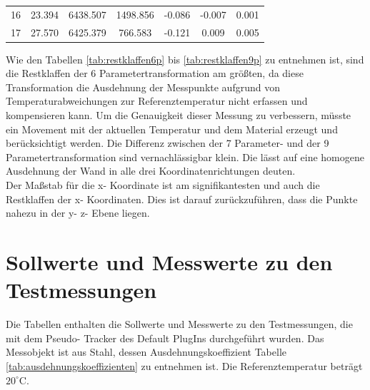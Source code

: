 \begin{table}[h]
\begin{tabular}{ccccccc}
\multicolumn{1}{p{2cm}|}{16} &
\multicolumn{1}{p{2cm}|}{23.394} &
\multicolumn{1}{p{2cm}|}{6438.507} &
\multicolumn{1}{p{2cm}|}{1498.856} &
\multicolumn{1}{p{2cm}|}{-0.086} &
\multicolumn{1}{p{2cm}|}{-0.007} &
\multicolumn{1}{p{2cm}}{0.001} \\

\multicolumn{1}{p{2cm}|}{17} &
\multicolumn{1}{p{2cm}|}{27.570} &
\multicolumn{1}{p{2cm}|}{6425.379} &
\multicolumn{1}{p{2cm}|}{766.583} &
\multicolumn{1}{p{2cm}|}{-0.121} &
\multicolumn{1}{p{2cm}|}{0.009} &
\multicolumn{1}{p{2cm}}{0.005} \\

\bottomrule
\end{tabular}
\end{table}

Wie den Tabellen \ref{tab:restklaffen6p} bis \ref{tab:restklaffen9p} zu entnehmen ist, sind die Restklaffen der 6 Parametertransformation am größten, da diese Transformation die Ausdehnung der Messpunkte aufgrund von Temperaturabweichungen zur Referenztemperatur nicht erfassen und kompensieren kann. Um die Genauigkeit dieser Messung zu verbessern, müsste ein Movement mit der aktuellen Temperatur und dem Material erzeugt und berücksichtigt werden. Die Differenz zwischen der 7 Parameter- und der 9 Parametertransformation sind vernachlässigbar klein. Die lässt auf eine homogene Ausdehnung der Wand in alle drei Koordinatenrichtungen deuten.\\
Der Maßstab für die x- Koordinate ist am signifikantesten und auch die Restklaffen der x- Koordinaten. Dies ist darauf zurückzuführen, dass die Punkte nahezu in der y- z- Ebene liegen.

\chapter{Sollwerte und Messwerte zu den Testmessungen}

Die Tabellen enthalten die Sollwerte und Messwerte zu den Testmessungen, die mit dem Pseudo- Tracker des Default PlugIns durchgeführt wurden. Das Messobjekt ist aus Stahl, dessen Ausdehnungskoeffizient Tabelle \ref{tab:ausdehnungskoeffizienten} zu entnehmen ist. Die Referenztemperatur beträgt $20^\circ\text{C}$.

